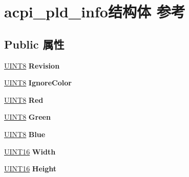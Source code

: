 \hypertarget{structacpi__pld__info}{}\section{acpi\+\_\+pld\+\_\+info结构体 参考}
\label{structacpi__pld__info}
\subsection*{Public 属性}
\begin{DoxyCompactItemize}
\item 
\mbox{\label{structacpi__pld__info_a7225b493326ccd2eda0b0f7042bbbfbd}} 
\hyperlink{_processor_bind_8h_ab27e9918b538ce9d8ca692479b375b6a}{U\+I\+N\+T8} {\bfseries Revision}
\item 
\mbox{\label{structacpi__pld__info_a9d561924c05f9e4cc613fe2d70248a6f}} 
\hyperlink{_processor_bind_8h_ab27e9918b538ce9d8ca692479b375b6a}{U\+I\+N\+T8} {\bfseries Ignore\+Color}
\item 
\mbox{\label{structacpi__pld__info_ab1298a784ad58da60c8956d720029ccd}} 
\hyperlink{_processor_bind_8h_ab27e9918b538ce9d8ca692479b375b6a}{U\+I\+N\+T8} {\bfseries Red}
\item 
\mbox{\label{structacpi__pld__info_a2e7b9c8c38bfd03b98b2f364f1a7bb9a}} 
\hyperlink{_processor_bind_8h_ab27e9918b538ce9d8ca692479b375b6a}{U\+I\+N\+T8} {\bfseries Green}
\item 
\mbox{\label{structacpi__pld__info_a170278dfb0a05afee52208c6bb912d2e}} 
\hyperlink{_processor_bind_8h_ab27e9918b538ce9d8ca692479b375b6a}{U\+I\+N\+T8} {\bfseries Blue}
\item 
\mbox{\label{structacpi__pld__info_a3669a21712eb789f02c12054d135fc7f}} 
\hyperlink{_processor_bind_8h_a09f1a1fb2293e33483cc8d44aefb1eb1}{U\+I\+N\+T16} {\bfseries Width}
\item 
\mbox{\label{structacpi__pld__info_ace16a1819bcdc95b5382bbfb1db4824c}} 
\hyperlink{_processor_bind_8h_a09f1a1fb2293e33483cc8d44aefb1eb1}{U\+I\+N\+T16} {\bfseries Height}
\item 

\end{DoxyCompactItemize}

